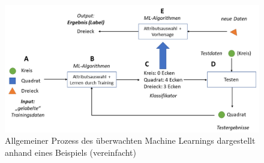 \begin{figure}[t]
    \centering
    \captionsetup{justification=centering,margin=2cm}
    \includegraphics[width=\textwidth]{images/ML}
    \caption{Allgemeiner Prozess des überwachten Machine Learnings dargestellt anhand eines Beispiels (vereinfacht)}\label{fig:ml}
\end{figure}

